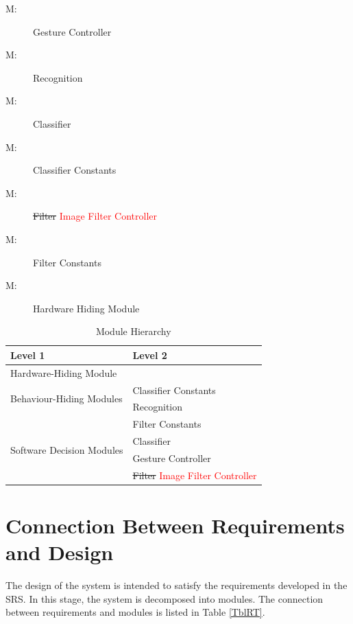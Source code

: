 \documentclass[12pt, titlepage]{article}
\newcounter{mnum}
\newcommand{\mthemnum}{M\themnum}
\begin{document}
\begin{description}

\item [ \mthemnum \label{mGC}:] Gesture Controller
\item [ \mthemnum \label{mR}:] Recognition
\item [ \mthemnum \label{mC}:] Classifier 
\item [ \mthemnum \label{mCC}:] Classifier Constants
\item [ \mthemnum \label{mF}:] \sout{Filter} \textcolor{red}{Image Filter Controller}
\item [ \mthemnum \label{mFC}:] Filter Constants
\item [ \mthemnum \label{mHH}:] Hardware Hiding Module
\end{description}


\begin{table}[h!]
\centering
\begin{tabular}{p{} p{}}
\toprule
\textbf{Level 1} & \textbf{Level 2}\\
\midrule

{Hardware-Hiding Module} & ~ \\
\midrule

\multirow{2}{0.3\textwidth}{Behaviour-Hiding Modules} & Classifier Constants\\
~ & Recognition\\
~ & Filter Constants\\
\midrule

\multirow{2}{0.3\textwidth}{Software Decision Modules} & Classifier\\
~ & Gesture Controller\\
~ & \sout{Filter} \textcolor{red}{Image Filter Controller}\\
\bottomrule






\end{tabular}
\caption{Module Hierarchy}
\label{TblMH}
\end{table}

\section{Connection Between Requirements and Design} \label{SecConnection}

The design of the system is intended to satisfy the requirements developed in
the SRS. In this stage, the system is decomposed into modules. The connection
between requirements and modules is listed in Table \ref{TblRT}.
\end{document}
